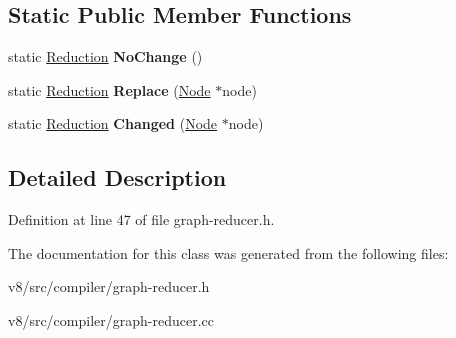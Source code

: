 \subsection*{Static Public Member Functions}
\begin{DoxyCompactItemize}
\item 
\mbox{\label{classv8_1_1internal_1_1compiler_1_1Reducer_af5fd251e94125282e7e21ad3280b407c}} 
static \mbox{\hyperlink{classv8_1_1internal_1_1compiler_1_1Reduction}{Reduction}} {\bfseries No\+Change} ()
\item 
\mbox{\label{classv8_1_1internal_1_1compiler_1_1Reducer_a612beabd9842099138797d6b52f1941e}} 
static \mbox{\hyperlink{classv8_1_1internal_1_1compiler_1_1Reduction}{Reduction}} {\bfseries Replace} (\mbox{\hyperlink{classv8_1_1internal_1_1compiler_1_1Node}{Node}} $\ast$node)
\item 
\mbox{\label{classv8_1_1internal_1_1compiler_1_1Reducer_a6309e9866a5be979111ffb8dc652a7af}} 
static \mbox{\hyperlink{classv8_1_1internal_1_1compiler_1_1Reduction}{Reduction}} {\bfseries Changed} (\mbox{\hyperlink{classv8_1_1internal_1_1compiler_1_1Node}{Node}} $\ast$node)
\end{DoxyCompactItemize}


\subsection{Detailed Description}


Definition at line 47 of file graph-\/reducer.\+h.



The documentation for this class was generated from the following files\+:\begin{DoxyCompactItemize}
\item 
v8/src/compiler/graph-\/reducer.\+h\item 
v8/src/compiler/graph-\/reducer.\+cc\end{DoxyCompactItemize}
